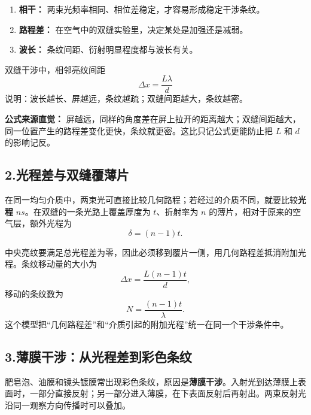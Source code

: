 \begin{enumerate}
  \item \textbf{相干：} 两束光频率相同、相位差稳定，才容易形成稳定干涉条纹。
  \item \textbf{路程差：} 在空气中的双缝实验里，决定某处是加强还是减弱。
  \item \textbf{波长：} 条纹间距、衍射明显程度都与波长有关。
\end{enumerate}

双缝干涉中，相邻亮纹间距
\[
\Delta x=\frac{L\lambda}{d}
\]
说明：波长越长、屏越远，条纹越疏；双缝间距越大，条纹越密。

\textbf{公式来源直觉：} 屏越远，同样的角度差在屏上拉开的距离越大；双缝间距越大，同一位置产生的路程差变化更快，条纹就更密。这比只记公式更能防止把 $L$ 和 $d$ 的影响记反。

\subsection*{2.\quad 光程差与双缝覆薄片}

在同一均匀介质中，两束光可直接比较几何路程；若经过的介质不同，就要比较\textbf{光程} $ns$。在双缝的一条光路上覆盖厚度为 $t$、折射率为 $n$ 的薄片，相对于原来的空气层，额外光程为
\[
\delta=(n-1)t.
\]

\begin{center}


\label{fig:double-slit-glass-plate}
\end{center}

中央亮纹要满足总光程差为零，因此必须移到覆片一侧，用几何路程差抵消附加光程。条纹移动量的大小为
\[
\boxed{\Delta x=\frac{L(n-1)t}{d}},
\]
移动的条纹数为
\[
\boxed{N=\frac{(n-1)t}{\lambda}}.
\]
这个模型把“几何路程差”和“介质引起的附加光程”统一在同一个干涉条件中。

\subsection*{3.\quad 薄膜干涉：从光程差到彩色条纹}

肥皂泡、油膜和镜头镀膜常出现彩色条纹，原因是\textbf{薄膜干涉}。入射光到达薄膜上表面时，一部分直接反射；另一部分进入薄膜，在下表面反射后再射出。两束反射光沿同一观察方向传播时可以叠加。

\begin{center}


\label{fig:thin-film-interference}
\end{center}

